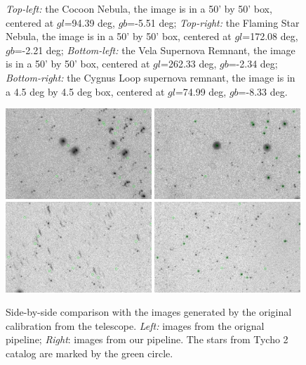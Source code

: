 \documentclass[12pt, preprint]{aastex61}
\begin{document}
\begin{figure}[p]
\begin{center}
\end{center}
\caption{
  \label{map1}
   \emph{Top-left:}  the Cocoon Nebula, the image is in a 50' by 50' box, centered at $gl$=94.39 deg, $gb$=-5.51 deg;
   \emph{Top-right:} the Flaming Star Nebula, the image is in a 50' by 50' box, centered at $gl$=172.08 deg, $gb$=-2.21 deg;
   \emph{Bottom-left:} the Vela Supernova Remnant, the image is in a 50' by 50' box, centered at $gl$=262.33 deg, $gb$=-2.34 deg;
   \emph{Bottom-right:} the Cygnus Loop supernova remnant, the image is in a 4.5 deg by 4.5 deg box, centered at $gl$=74.99 deg, $gb$=-8.33 deg.
}
\end{figure}

\begin{figure}[p]
\begin{center}
\includegraphics[width=0.49\textwidth]{figures/pip0}
\includegraphics[width=0.49\textwidth]{figures/cal0}
\includegraphics[width=0.49\textwidth]{figures/pip1}
\includegraphics[width=0.49\textwidth]{figures/cal1}
\end{center}
\caption{
  \label{map2}
  Side-by-side comparison with the images generated by the original calibration from the telescope.
  \emph{Left:} images from the orignal pipeline;
  \emph{Right}: images from our pipeline.
  The stars from Tycho 2 catalog are marked by the green circle.
}
\end{figure}
\end{document}
